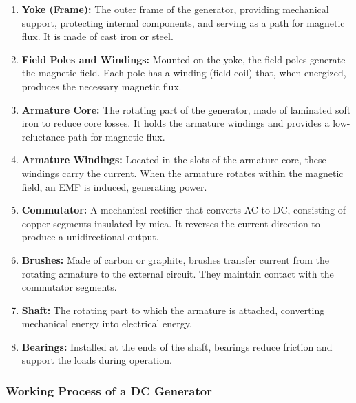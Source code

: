 \documentclass[a4paper,12pt]{article}
\begin{document}
	\begin{enumerate}
\item \textbf{Yoke (Frame):} 
The outer frame of the generator, providing mechanical support, protecting internal components, and serving as a path for magnetic flux. It is made of cast iron or steel.

\item \textbf{Field Poles and Windings:} 
Mounted on the yoke, the field poles generate the magnetic field. Each pole has a winding (field coil) that, when energized, produces the necessary magnetic flux.

\item \textbf{Armature Core:} 
The rotating part of the generator, made of laminated soft iron to reduce core losses. It holds the armature windings and provides a low-reluctance path for magnetic flux.

\item \textbf{Armature Windings:} 
Located in the slots of the armature core, these windings carry the current. When the armature rotates within the magnetic field, an EMF is induced, generating power.

\item \textbf{Commutator:} 
A mechanical rectifier that converts AC to DC, consisting of copper segments insulated by mica. It reverses the current direction to produce a unidirectional output.

\item \textbf{Brushes:} 
Made of carbon or graphite, brushes transfer current from the rotating armature to the external circuit. They maintain contact with the commutator segments.

\item \textbf{Shaft:} 
The rotating part to which the armature is attached, converting mechanical energy into electrical energy.

\item \textbf{Bearings:} 
Installed at the ends of the shaft, bearings reduce friction and support the loads during operation.

	\end{enumerate}
	\subsubsection{Working Process of a DC Generator}
	
\end{document}
